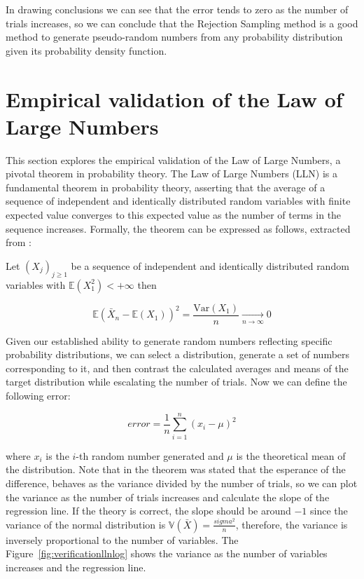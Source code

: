 \documentclass{report}
\begin{document}
In drawing conclusions we can see that the error tends to zero as the number of trials increases, so we can conclude that the Rejection Sampling method is a good method to generate pseudo-random numbers from any probability distribution given its probability density function.

\section{Empirical validation of the Law of Large Numbers}
\label{sec:lln}

This section explores the empirical validation of the Law of Large Numbers, a pivotal theorem in probability theory. The Law of Large Numbers (LLN) is a fundamental theorem in probability theory, asserting that the average of a sequence of independent and identically distributed random variables with finite expected value converges to this expected value as the number of terms in the sequence increases. Formally, the theorem can be expressed as follows, extracted from \cite{jourdain2016probabilites}:

\begin{theorem}
	Let $(X_j)_{j \geq 1}$ be a sequence of independent and identically distributed random variables with $\mathbb{E}(X_1^2) < + \infty$ then

	\begin{equation}
		\mathbb{E}(\bar{X}_n - \mathbb{E}(X_1))^2 = \frac{\mathrm{Var}(X_1)}{n} \xrightarrow[n \to \infty]{} 0
	\end{equation}
\end{theorem}

Given our established ability to generate random numbers reflecting specific probability distributions, we can select a distribution, generate a set of numbers corresponding to it, and then contrast the calculated averages and means of the target distribution while escalating the number of trials. Now we can define the following error:

\begin{equation} 
	error = \frac{1}{n}\sum_{i=1}^{n} (x_i - \mu)^2
\end{equation}

where \(x_i\) is the \(i\)-th random number generated and \(\mu\) is the theoretical mean of the distribution. Note that in the theorem was stated that the esperance of the difference, behaves as the variance divided by the number of trials, so we can plot the variance as the number of trials increases and calculate the slope of the regression line. If the theory is correct, the slope should be around \(-1\) since the variance of the normal distribution is \(\mathbb{V}(\bar{X}) = \frac{sigma^2}{n}\), therefore, the variance is inversely proportional to the number of variables. The Figure~\ref{fig:verificationllnlog} shows the variance as the number of variables increases and the regression line.
\end{document}
